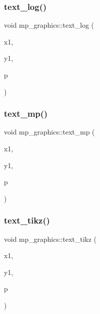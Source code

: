 \mbox{\label{classmp__graphics_a3a8320de1e68f3c290e138355f05f8ae}} 
\subsubsection{\texorpdfstring{text\+\_\+log()}{text\_log()}}
{\footnotesize\ttfamily void mp\+\_\+graphics\+::text\+\_\+log (\begin{DoxyParamCaption}\item[{\mbox{\hyperlink{galois_8h_a09fddde158a3a20bd2dcadb609de11dc}{I\+NT}}}]{x1,  }\item[{\mbox{\hyperlink{galois_8h_a09fddde158a3a20bd2dcadb609de11dc}{I\+NT}}}]{y1,  }\item[{const char $\ast$}]{p }\end{DoxyParamCaption})}

\mbox{\label{classmp__graphics_ad30aeb75639e84d876dade51faa50bee}} 
\subsubsection{\texorpdfstring{text\+\_\+mp()}{text\_mp()}}
{\footnotesize\ttfamily void mp\+\_\+graphics\+::text\+\_\+mp (\begin{DoxyParamCaption}\item[{\mbox{\hyperlink{galois_8h_a09fddde158a3a20bd2dcadb609de11dc}{I\+NT}}}]{x1,  }\item[{\mbox{\hyperlink{galois_8h_a09fddde158a3a20bd2dcadb609de11dc}{I\+NT}}}]{y1,  }\item[{const char $\ast$}]{p }\end{DoxyParamCaption})}

\mbox{\label{classmp__graphics_ac7e4333813701bcc76fc5eba7700bdbd}} 
\subsubsection{\texorpdfstring{text\+\_\+tikz()}{text\_tikz()}}
{\footnotesize\ttfamily void mp\+\_\+graphics\+::text\+\_\+tikz (\begin{DoxyParamCaption}\item[{\mbox{\hyperlink{galois_8h_a09fddde158a3a20bd2dcadb609de11dc}{I\+NT}}}]{x1,  }\item[{\mbox{\hyperlink{galois_8h_a09fddde158a3a20bd2dcadb609de11dc}{I\+NT}}}]{y1,  }\item[{const char $\ast$}]{p }\end{DoxyParamCaption})}

